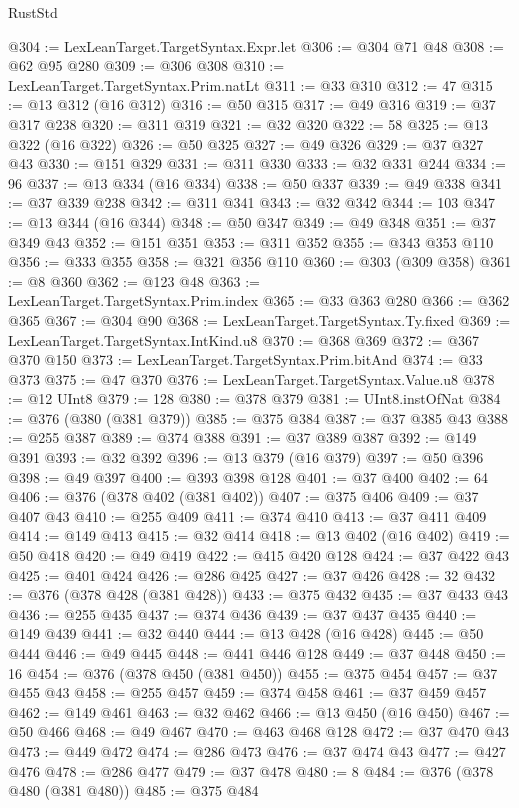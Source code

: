 \begin{lexlean}{RustStd}
\begin{coremodule}
@304 := LexLeanTarget.TargetSyntax.Expr.let
@306 := @304 @71 @48
@308 := @62 @95 @280
@309 := @306 @308
@310 := LexLeanTarget.TargetSyntax.Prim.natLt
@311 := @33 @310
@312 := 47
@315 := @13 @312 (@16 @312)
@316 := @50 @315
@317 := @49 @316
@319 := @37 @317 @238
@320 := @311 @319
@321 := @32 @320
@322 := 58
@325 := @13 @322 (@16 @322)
@326 := @50 @325
@327 := @49 @326
@329 := @37 @327 @43
@330 := @151 @329
@331 := @311 @330
@333 := @32 @331 @244
@334 := 96
@337 := @13 @334 (@16 @334)
@338 := @50 @337
@339 := @49 @338
@341 := @37 @339 @238
@342 := @311 @341
@343 := @32 @342
@344 := 103
@347 := @13 @344 (@16 @344)
@348 := @50 @347
@349 := @49 @348
@351 := @37 @349 @43
@352 := @151 @351
@353 := @311 @352
@355 := @343 @353 @110
@356 := @333 @355
@358 := @321 @356 @110
@360 := @303 (@309 @358)
@361 := @8 @360
@362 := @123 @48
@363 := LexLeanTarget.TargetSyntax.Prim.index
@365 := @33 @363 @280
@366 := @362 @365
@367 := @304 @90
@368 := LexLeanTarget.TargetSyntax.Ty.fixed
@369 := LexLeanTarget.TargetSyntax.IntKind.u8
@370 := @368 @369
@372 := @367 @370 @150
@373 := LexLeanTarget.TargetSyntax.Prim.bitAnd
@374 := @33 @373
@375 := @47 @370
@376 := LexLeanTarget.TargetSyntax.Value.u8
@378 := @12 UInt8
@379 := 128
@380 := @378 @379
@381 := UInt8.instOfNat
@384 := @376 (@380 (@381 @379))
@385 := @375 @384
@387 := @37 @385 @43
@388 := @255 @387
@389 := @374 @388
@391 := @37 @389 @387
@392 := @149 @391
@393 := @32 @392
@396 := @13 @379 (@16 @379)
@397 := @50 @396
@398 := @49 @397
@400 := @393 @398 @128
@401 := @37 @400
@402 := 64
@406 := @376 (@378 @402 (@381 @402))
@407 := @375 @406
@409 := @37 @407 @43
@410 := @255 @409
@411 := @374 @410
@413 := @37 @411 @409
@414 := @149 @413
@415 := @32 @414
@418 := @13 @402 (@16 @402)
@419 := @50 @418
@420 := @49 @419
@422 := @415 @420 @128
@424 := @37 @422 @43
@425 := @401 @424
@426 := @286 @425
@427 := @37 @426
@428 := 32
@432 := @376 (@378 @428 (@381 @428))
@433 := @375 @432
@435 := @37 @433 @43
@436 := @255 @435
@437 := @374 @436
@439 := @37 @437 @435
@440 := @149 @439
@441 := @32 @440
@444 := @13 @428 (@16 @428)
@445 := @50 @444
@446 := @49 @445
@448 := @441 @446 @128
@449 := @37 @448
@450 := 16
@454 := @376 (@378 @450 (@381 @450))
@455 := @375 @454
@457 := @37 @455 @43
@458 := @255 @457
@459 := @374 @458
@461 := @37 @459 @457
@462 := @149 @461
@463 := @32 @462
@466 := @13 @450 (@16 @450)
@467 := @50 @466
@468 := @49 @467
@470 := @463 @468 @128
@472 := @37 @470 @43
@473 := @449 @472
@474 := @286 @473
@476 := @37 @474 @43
@477 := @427 @476
@478 := @286 @477
@479 := @37 @478
@480 := 8
@484 := @376 (@378 @480 (@381 @480))
@485 := @375 @484

\end{coremodule}
\end{lexlean}
